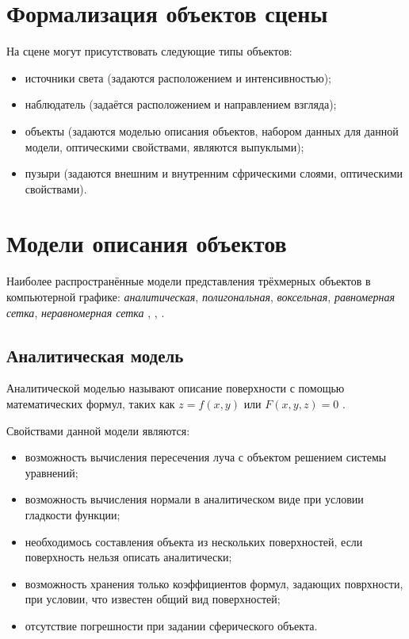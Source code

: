 \section{Формализация объектов сцены}

На сцене могут присутствовать следующие типы объектов:
\begin{itemize}[label=---]
    \item источники света (задаются расположением и интенсивностью);
    \item наблюдатель (задаётся расположением и направлением взгляда);
    \item объекты (задаются моделью описания объектов, набором данных для данной модели, оптическими свойствами, являются выпуклыми);
    \item пузыри (задаются внешним и внутренним сфрическими слоями, оптическими свойствами).
\end{itemize}





\section{Модели описания объектов}

Наиболее распространённые модели представления трёхмерных объектов в компьютерной графике: \textit{аналитическая}, \textit{полигональная}, \textit{воксельная}, \textit{равномерная сетка}, \textit{неравномерная сетка} \cite{piter_2002}, \cite{falcidieno2012modeling}, \cite{salomon2012computer}.

\subsection{Аналитическая модель}

Аналитической моделью называют описание поверхности с помощью математических формул, таких как $z = f(x, y)$ или $F(x, y, z) = 0$ \cite{piter_2002}.

Свойствами данной модели являются:
\begin{itemize}[label=---]
    \item возможность вычисления пересечения луча с объектом решением системы уравнений;
    \item возможность вычисления нормали в аналитическом виде при условии гладкости функции;
    \item необходимось составления объекта из нескольких поверхностей, если поверхность нельзя описать аналитически;
    \item возможность хранения только коэффициентов формул, задающих поврхности, при условии, что известен общий вид поверхностей;
    \item отсутствие погрешности при задании сферического объекта.
\end{itemize}



